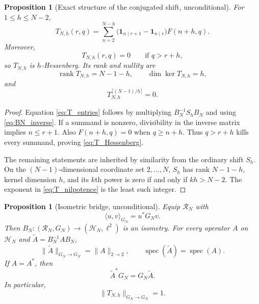 \documentclass[11pt]{amsart}
\numberwithin{equation}{section}
\theoremstyle{plain}
\newtheorem{proposition}[theorem]{Proposition}
\theoremstyle{definition}
\theoremstyle{remark}
\newcommand{\one}{\mathbf 1}
\newcommand{\Fsurf}{F}
\DeclareMathOperator{\rank}{rank}
\DeclareMathOperator{\spec}{spec}
\begin{document}
\begin{proposition}[Exact structure of the conjugated shift, unconditional]
\label{prop:conjugated_shift}
For $1\le h\le N-2$,
\begin{equation}
T_{N,h}(r,q)
=
\sum_{n=2}^{N-h}
\bigl(\one_{n\mid r+1}-\one_{n\mid r}\bigr)\Fsurf(n+h,q).
\label{eq:T_entries}
\end{equation}
Moreover,
\begin{equation}
T_{N,h}(r,q)=0
\qquad\text{if }q>r+h,
\label{eq:T_Hessenberg}
\end{equation}
so $T_{N,h}$ is $h$-Hessenberg.  Its rank and nullity are
\begin{equation}
\rank T_{N,h}=N-1-h,
\qquad
\dim\ker T_{N,h}=h,
\label{eq:T_rank_kernel}
\end{equation}
and
\begin{equation}
T_{N,h}^{\lceil(N-1)/h\rceil}=0.
\label{eq:T_nilpotence}
\end{equation}
\end{proposition}

\begin{proof}
Equation \eqref{eq:T_entries} follows by multiplying $B_N^{-1}S_hB_N$ and using \eqref{eq:BN_inverse}.  If a summand is nonzero, divisibility in the inverse matrix implies $n\le r+1$.  Also $F(n+h,q)=0$ when $q\ge n+h$.  Thus $q>r+h$ kills every summand, proving \eqref{eq:T_Hessenberg}.

The remaining statements are inherited by similarity from the ordinary shift $S_h$.  On the $(N-1)$-dimensional coordinate set $2,\ldots,N$, $S_h$ has rank $N-1-h$, kernel dimension $h$, and its $k$th power is zero if and only if $kh>N-2$.  The exponent in \eqref{eq:T_nilpotence} is the least such integer.
\end{proof}

\begin{proposition}[Isometric bridge, unconditional]
\label{prop:isometric_bridge}
Equip $\mathcal R_N$ with
\begin{equation}
\langle u,v\rangle_{G_N}=u^*G_Nv.
\label{eq:GN_inner_product}
\end{equation}
Then $B_N:(\mathcal R_N,G_N)\to(\mathcal H_N,\ell^2)$ is an isometry.  For every operator $A$ on $\mathcal H_N$ and $\widetilde A=B_N^{-1}AB_N$,
\begin{equation}
\|\widetilde A\|_{G_N\to G_N}=\|A\|_{2\to2},
\qquad
\spec(\widetilde A)=\spec(A).
\label{eq:isometric_similarity}
\end{equation}
If $A=A^*$, then
\begin{equation}
\widetilde A^*G_N=G_N\widetilde A.
\label{eq:G_selfadjoint}
\end{equation}
In particular,
\begin{equation}
\|T_{N,h}\|_{G_N\to G_N}=1.
\label{eq:T_norm_one}
\end{equation}
\end{proposition}
\end{document}
